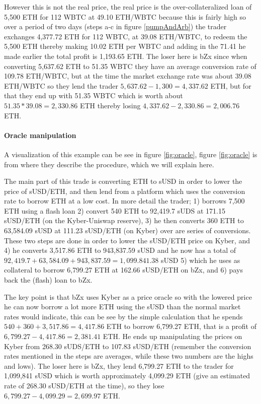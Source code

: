 However this is not the real price, the real price is the over-collateralized loan of 5,500 ETH for 112 WBTC at 49.10 ETH/WBTC because this is fairly high so over a period of two days (steps a-c in figure \ref{pumpAndArb}) the trader exchanges 4,377.72 ETH for 112 WBTC, at 39.08 ETH/WBTC, to redeem the 5,500 ETH thereby making 10.02 ETH per WBTC and adding in the 71.41 he made earlier the total profit is 1,193.65 ETH. The loser here is bZx since when converting 5,637.62 ETH to 51.35 WBTC they have an average conversion rate of 109.78 ETH/WBTC, but at the time the market exchange rate was about 39.08 ETH/WBTC so they lend the trader $5,637.62-1,300=4,337.62$ ETH, but for that they end up with 51.35 WBTC which is worth about $51.35*39.08=2,330.86$ ETH thereby losing $4,337.62-2,330.86=2,006.76$ ETH.

\paragraph{Oracle manipulation} A visualization of this example can be see in figure \ref{fig:oracle}, figure \ref{fig:oracle} is from \cite{attack} where they describe the procedure, which we will explain here.

The main part of this trade is converting ETH to sUSD in order to lower the price of sUSD/ETH, and then lend from a platform which uses the conversion rate to borrow ETH at a low cost. In more detail the trader; 1) borrows 7,500 ETH using a flash loan 2) convert 540 ETH to 92,419.7 sUDS at 171.15 sUSD/ETH (on the Kyber-Uniswap reserve), 3) he then converts 360 ETH to 63,584.09 sUSD at 111.23 sUSD/ETH (on Kyber) over are series of conversions. These two steps are done in order to lower the sUSD/ETH price on Kyber, and 4) he converts 3,517.86 ETH to 943,837.59 sUSD and he now has a total of $92,419.7+63,584.09+943,837.59=1,099.841.38$ sUSD 5) which he uses as collateral to borrow 6,799.27 ETH at 162.66 sUSD/ETH on bZx, and 6) pays back the (flash) loan to bZx.

The key point is that bZx uses Kyber as a price oracle so with the lowered price he can now borrow a lot more ETH using the sUSD than the normal market rates would indicate, this can be see by the simple calculation that he spends $540+360+3,517.86=4,417.86$ ETH to borrow 6,799.27 ETH, that is a profit of $6,799.27-4,417.86=2,381.41$ ETH. He ends up manipulating the prices on Kyber from 268.30 sUDS/ETH to 107.83 sUSD/ETH (remember the conversion rates mentioned in the steps are averages, while these two numbers are the highs and lows). The loser here is bZx, they lend 6,799.27 ETH to the trader for 1,099,841 sUSD which is worth approximately 4,099.29 ETH (give an estimated rate of 268.30 sUSD/ETH at the time), so they lose $6,799.27-4,099.29=2,699.97$ ETH.  